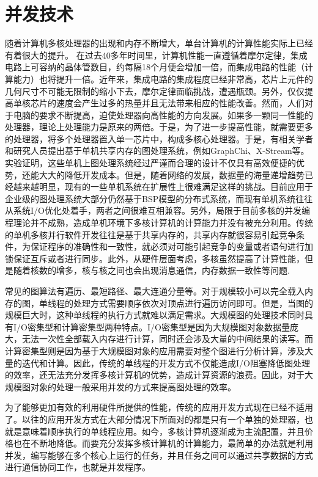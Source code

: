 \section{并发技术}
随着计算机多核处理器的出现和内存不断增大，单台计算机的计算性能实际上已经有着很大的提升。
在过去40多年时间里，计算机性能一直遵循着摩尔定律，集成电路上可容纳的晶体管数目，约每隔18个月便会增加一倍，而集成电路的性能（计算能力）也将提升一倍。近年来，集成电路的集成程度已经非常高，芯片上元件的几何尺寸不可能无限制的缩小下去，摩尔定律面临挑战，遭遇瓶颈。另外，仅仅提高单核芯片的速度会产生过多的热量并且无法带来相应的性能改善。然而，人们对于电脑的要求不断提高，迫使处理器向高性能的方向发展。如果多一颗同一性能的处理器，理论上处理能力是原来的两倍。于是，为了进一步提高性能，就需要更多的处理器，将多个处理器置入单一芯片中，构成多核心处理器。于是，有相关学者和研究人员提出基于单机共享内存的图处理系统，例如GraphChi、X-Stream等。实验证明，这些单机上图处理系统经过严谨而合理的设计不仅具有高效便捷的优势，还能大大的降低开发成本。但是，随着网络的发展，数据量的海量递增趋势已经越来越明显，现有的一些单机系统在扩展性上很难满足这样的挑战。目前应用于企业级的图处理系统大部分仍然基于BSP模型的分布式系统，而现有单机系统往往从系统I/O优化处着手，两者之间很难互相兼容。另外，局限于目前多核的并发编程理论并不成熟，造成单机环境下多核计算机的计算能力并没有被充分利用。传统的单机多核并行软件开发往往是基于共享内存的，共享内存就很容易引起竞争条件，为保证程序的准确性和一致性，就必须对可能引起竞争的变量或者语句进行加锁保证互斥或者进行同步。此外，从硬件层面考虑，多核虽然提高了计算性能，但是随着核数的增多，核与核之间也会出现消息通信，内存数据一致性等问题.

常见的图算法有遍历、最短路径、最大连通分量等。对于规模较小可以完全载入内存的图，单线程的处理方式需要顺序依次对顶点进行遍历访问即可。但是，当图的规模巨大时，这种单线程的执行方式就难以满足需求。大规模图的处理技术同时具有I/O密集型和计算密集型两种特点。I/O密集型是因为大规模图对象数据量庞大，无法一次性全部载入内存进行计算，同时还会涉及大量的中间结果的读写。而计算密集型则是因为基于大规模图对象的应用需要对整个图进行分析计算，涉及大量的迭代和计算。因此，传统的单线程的开发方式不仅能造成I/O阻塞降低图处理的效率，还无法充分发挥多核计算机的优势，造成计算资源的浪费。因此，对于大规模图对象的处理一般采用并发的方式来提高图处理的效率。

为了能够更加有效的利用硬件所提供的性能，传统的应用开发方式现在已经不适用了。以往的应用开发方式在大部分情况下所面对的都是只有一个单独的处理器，也就是意味着顺序执行的单线程应用。如今，多核计算机逐渐成为主流配置，并且价格也在不断地降低。而要充分发挥多核计算机的计算能力，最简单的办法就是利用并发，编写能够在多个核心上运行的任务，并且任务之间可以通过共享数据的方式进行通信协同工作，也就是并发程序。


